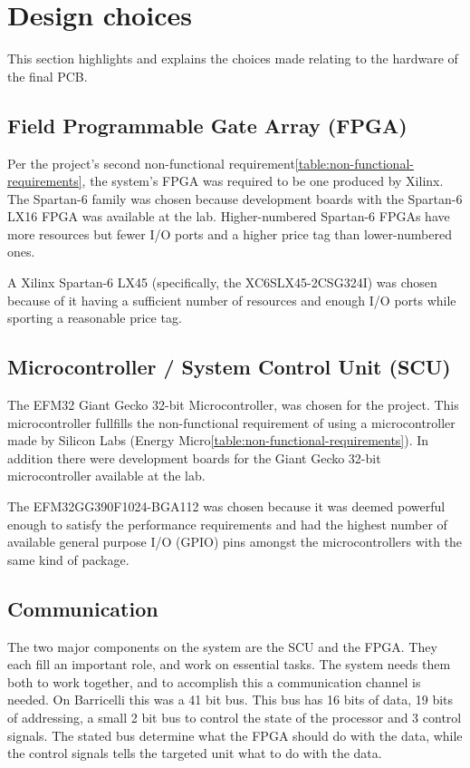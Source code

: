 \section{Design choices} 
\label{pcb:design-choices}
This section highlights and explains the choices made relating to the hardware of the final PCB.

\subsection{Field Programmable Gate Array (FPGA)} \label{pcb:design-choices:ss:fpga}
Per the project's second non-functional requirement\vref{table:non-functional-requirements}, the system's FPGA was required to be one produced by Xilinx.
The Spartan-6 family was chosen because development boards with the Spartan-6 LX16 FPGA was available at the lab.
Higher-numbered Spartan-6 FPGAs have more resources but fewer I/O ports and a higher price tag than lower-numbered ones.

A Xilinx Spartan-6 LX45 (specifically, the XC6SLX45-2CSG324I) was chosen because of it having a sufficient number of resources and enough I/O ports while sporting a reasonable price tag.

\subsection{Microcontroller / System Control Unit (SCU)} \label{pcb:design-choices:ss:scu}
The EFM32 Giant Gecko 32-bit Microcontroller, was chosen for the project.
This microcontroller fullfills the non-functional requirement of using a microcontroller made by Silicon Labs (Energy Micro\vref{table:non-functional-requirements}).
In addition there were development boards for the Giant Gecko 32-bit microcontroller available at the lab.

The EFM32GG390F1024-BGA112 was chosen because it was deemed powerful enough to satisfy the performance requirements and had the highest number of available general purpose I/O (GPIO) pins amongst the microcontrollers with the same kind of package.

\subsection{Communication} \label{pcb:design-choices:ss:internal_communication}
The two major components on the system are the SCU and the FPGA.
They each fill an important role, and work on essential tasks.
The system needs them both to work together, and to accomplish this a communication channel is needed.
On Barricelli this was a 41 bit bus.
This bus has 16 bits of data, 19 bits of addressing, a small 2 bit bus to control the state of the processor and 3 control signals.
The stated bus determine what the FPGA should do with the data, while the control signals tells the targeted unit what to do with the data. 


